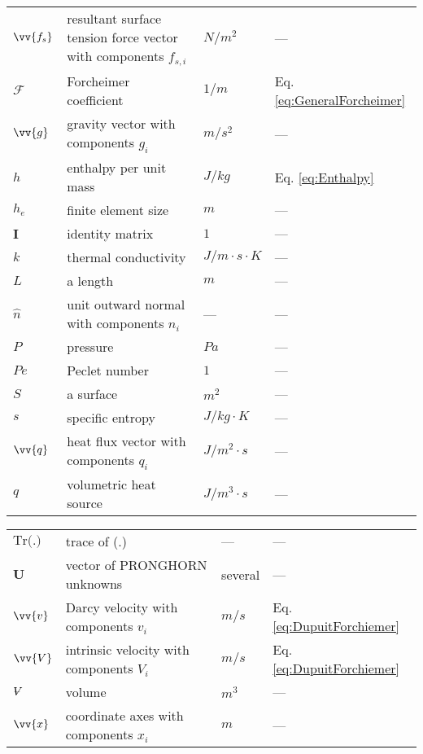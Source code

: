 \documentclass[10pt]{article}
\newcommand{\volume}{\mathop{\ooalign{\hfil$V$\hfil\cr\kern0.08em--\hfil\cr}}\nolimits}
\numberwithin{equation}{section} %
\begin{document}
\begin{tabular}{l l l l}
\(\vv{f_s}\)				& resultant surface tension force vector with components \(f_{s,i}\) & \(N/m^2\)	& ---\\
\(\mathscr{F}\)			& Forcheimer coefficient						& \(1/m\)				& Eq. \eqref{eq:GeneralForcheimer}\\
\(\vv{g}\)				& gravity vector with components \(g_i\)			& \(m/s^2\)			& ---\\
\(h\)					& enthalpy per unit mass						& \(J/kg\)				& Eq. \eqref{eq:Enthalpy}\\
\(h_e\)				& finite element size							& \(m\)				& ---\\
\(\textbf{I}\)			& identity matrix							& \(1\)				& ---\\
\(k\)					& thermal conductivity						& \(J/m\cdot s\cdot K\)	& ---\\
\(L\)					& a length									& \(m\)				& ---\\
\(\hat{n}\)				& unit outward normal with components \(n_i\)		& ---					& ---\\
\(P\)					& pressure								& \(Pa\)				& ---\\
\(Pe\)				& Peclet number							& \(1\)				& ---\\
\(S\)					& a surface								& \(m^2\)				& ---\\
\(s\)					& specific entropy							& \(J/kg\cdot K\)		& ---\\
\(\vv{q}\)				& heat flux vector with components \(q_i\)			& \(J/m^2\cdot s\)		& ---\\
\(q\)					& volumetric heat source						& \(J/m^3\cdot s\)		& ---\\
\end{tabular}

\begin{tabular}{l l l l}
\(\textrm{Tr(.)}\)			& trace of (.)								& ---					& ---\\
\(\textbf{U}\)			& vector of PRONGHORN unknowns			& several				& ---\\
\(\vv{v}\)				& Darcy velocity with components \(v_i\)			&\(m/s\)				& Eq. \eqref{eq:DupuitForchiemer}\\
\(\vv{V}\)				& intrinsic velocity with components \(V_i\)			&\(m/s\)				& Eq. \eqref{eq:DupuitForchiemer}\\
\(\volume\)			& volume									&\(m^3\)				& ---\\
\(\vv{x}\)				& coordinate axes with components \(x_i\)			& \(m\)				& ---\\
\end{tabular}
\end{document}

